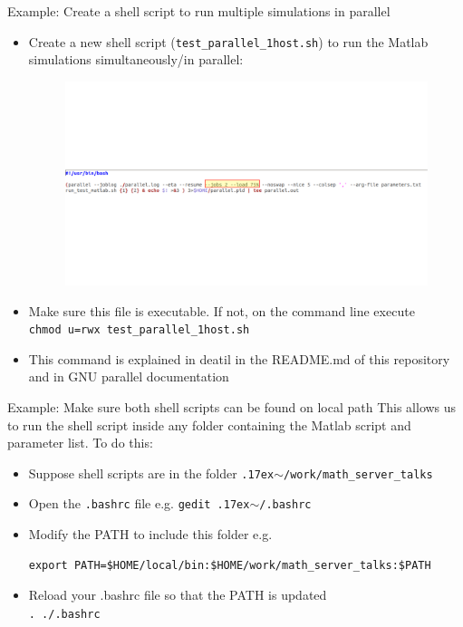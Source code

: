 \documentclass{beamer}
\begin{document}
\begin{frame}{Example: Create a shell script to run multiple simulations in parallel}
\begin{itemize}
\item Create a new shell script (\texttt{test\_parallel\_1host.sh}) to run the Matlab simulations simultaneously/in parallel:
\begin{figure}
\includegraphics[clip,trim=0in 2.5in 0in 2.5in,width=\linewidth]{figures/run_parallel_annotated.pdf}
\end{figure}
\item Make sure this file is executable. If not, on the command line execute \\ \texttt{chmod u=rwx test\_parallel\_1host.sh}
\item This command is explained in deatil in the README.md of this repository and in GNU parallel documentation
\end{itemize}
\end{frame}

\begin{frame}[fragile]{Example: Make sure both shell scripts can be found on local path}
This allows us to run the shell script inside any folder containing the Matlab script and parameter list. To do this:
\begin{itemize}
\item Suppose shell scripts are in the folder \texttt{{\raise.17ex\hbox{$\scriptstyle\mathtt{\sim}$}}/work/math\_server\_talks}
\item Open the \texttt{.bashrc} file e.g. \texttt{gedit {\raise.17ex\hbox{$\scriptstyle\mathtt{\sim}$}}/.bashrc}
\item Modify the PATH to include this folder e.g. 
\small
\begin{verbatim}
export PATH=$HOME/local/bin:$HOME/work/math_server_talks:$PATH
\end{verbatim}
\item Reload your .bashrc file so that the PATH is updated \\
\texttt{. ./.bashrc}
\end{itemize}
\end{frame}
\end{document}
